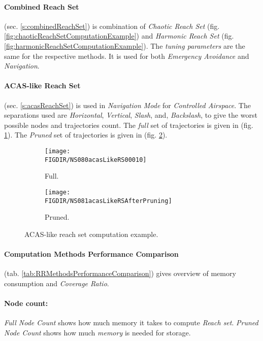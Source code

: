 \paragraph{Combined Reach Set} (sec. \ref{s:combinedReachSet}) is combination of \emph{Chaotic Reach Set} (fig. \ref{fig:chaoticReachSetComputationExample}) and \emph{Harmonic Reach Set} (fig. \ref{fig:harmonicReachSetComputationExample}). The \emph{tuning parameters} are the same for the respective methods. It is used for both \emph{Emergency Avoidance} and \emph{Navigation}. 

\paragraph{ACAS-like Reach Set} (sec. \ref{s:acasReachSet}) is used in \emph{Navigation Mode} for \emph{Controlled Airspace}. The separations used are \emph{Horizontal}, \emph{Vertical}, \emph{Slash}, and, \emph{Backslash}, to give the worst possible nodes and trajectories count. The \emph{full} set of trajectories is given in (fig. \ref{fig:acasLikeComputed}). The \emph{Pruned} set of trajectories is given in (fig. \ref{fig:acasLikePruned}).

\begin{figure}[H]
    \centering
    \begin{subfigure}{0.48\textwidth}
    	\centering
        \texttt{[image: \\FIGDIR/NS080acasLikeRS00010]}
        \caption{Full.}
        \label{fig:acasLikeComputed}
    \end{subfigure}
    \begin{subfigure}{0.48\textwidth}
    	\centering
        \texttt{[image: \\FIGDIR/NS081acasLikeRSAfterPruning]} 
        \caption{Pruned.}
        \label{fig:acasLikePruned}
    \end{subfigure}
    \caption{ACAS-like reach set computation example.}
    \label{fig:acasLikeReachSetComputationExample}
\end{figure}


\paragraph{Computation Methods Performance Comparison} (tab. \ref{tab:RRMethodsPerformanceComparison})  gives overview of memory consumption and \emph{Coverage Ratio}.

\paragraph{Node count:} \emph{Full Node Count} shows how much memory it takes to compute \emph{Reach set}. \emph{Pruned Node Count} shows how much \emph{memory} is needed for storage. 

